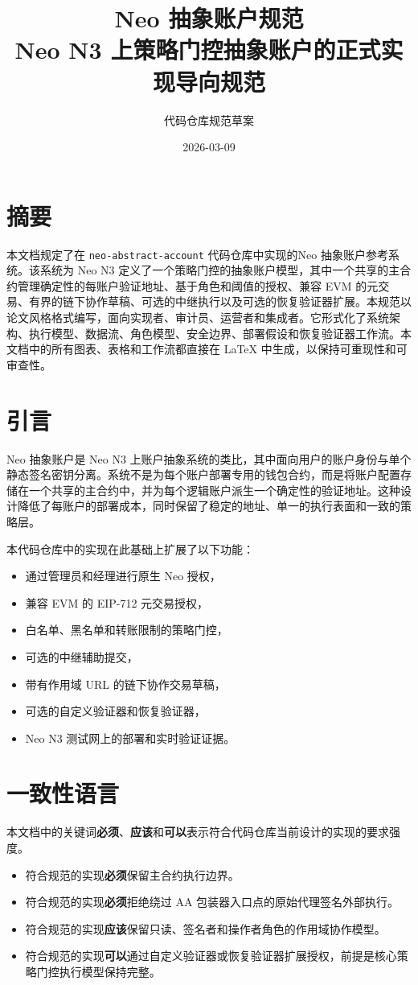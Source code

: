 \documentclass[11pt]{article}
\title{\textbf{Neo 抽象账户规范}\\
\large Neo N3 上策略门控抽象账户的正式实现导向规范}
\author{代码仓库规范草案}
\date{2026-03-09}
\newcommand{\code}[1]{\texttt{#1}}
\newcommand{\must}{\textbf{必须}}
\newcommand{\should}{\textbf{应该}}
\newcommand{\mayword}{\textbf{可以}}
\newcommand{\aasystem}{Neo 抽象账户}
\newcommand{\AAsystem}{AA}
\begin{document}
\maketitle
\tableofcontents
\newpage

\section{摘要}
本文档规定了在 \code{neo-abstract-account} 代码仓库中实现的\aasystem{}参考系统。该系统为 Neo N3 定义了一个策略门控的抽象账户模型，其中一个共享的主合约管理确定性的每账户验证地址、基于角色和阈值的授权、兼容 EVM 的元交易、有界的链下协作草稿、可选的中继执行以及可选的恢复验证器扩展。本规范以论文风格格式编写，面向实现者、审计员、运营者和集成者。它形式化了系统架构、执行模型、数据流、角色模型、安全边界、部署假设和恢复验证器工作流。本文档中的所有图表、表格和工作流都直接在 LaTeX 中生成，以保持可重现性和可审查性。

\section{引言}
\aasystem{}是 Neo N3 上账户抽象系统的类比，其中面向用户的账户身份与单个静态签名密钥分离。系统不是为每个账户部署专用的钱包合约，而是将账户配置存储在一个共享的主合约中，并为每个逻辑账户派生一个确定性的验证地址。这种设计降低了每账户的部署成本，同时保留了稳定的地址、单一的执行表面和一致的策略层。

本代码仓库中的实现在此基础上扩展了以下功能：
\begin{itemize}
  \item 通过管理员和经理进行原生 Neo 授权，
  \item 兼容 EVM 的 EIP-712 元交易授权，
  \item 白名单、黑名单和转账限制的策略门控，
  \item 可选的中继辅助提交，
  \item 带有作用域 URL 的链下协作交易草稿，
  \item 可选的自定义验证器和恢复验证器，
  \item Neo N3 测试网上的部署和实时验证证据。
\end{itemize}

\section{一致性语言}
本文档中的关键词\must{}、\should{}和\mayword{}表示符合代码仓库当前设计的实现的要求强度。

\begin{itemize}
  \item 符合规范的实现\must{}保留主合约执行边界。
  \item 符合规范的实现\must{}拒绝绕过 \AAsystem{} 包装器入口点的原始代理签名外部执行。
  \item 符合规范的实现\should{}保留只读、签名者和操作者角色的作用域协作模型。
  \item 符合规范的实现\mayword{}通过自定义验证器或恢复验证器扩展授权，前提是核心策略门控执行模型保持完整。
\end{itemize}
\end{document}
